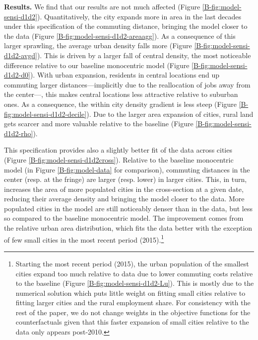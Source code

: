\documentclass[11pt]{report}
\begin{document}
\textbf{Results.} We find that our results are not much affected (Figure \ref{B-fig:model-sensi-d1d2}). Quantitatively, the city expands more in area in the last decades under this specification of the commuting distance, bringing the model closer to the data (Figure \ref{B-fig:model-sensi-d1d2-areaagg}). As a consequence of this larger sprawling, the average urban density falls more (Figure \ref{B-fig:model-sensi-d1d2-avgd}). This is driven by a larger fall of central density, the most noticeable difference relative to our baseline monocentric model (Figure \ref{B-fig:model-sensi-d1d2-d0}). With urban expansion, residents in central locations end up commuting larger distances---implicitly due to the reallocation of jobs away from the center---, this makes central locations less attractive relative to suburban ones. As a consequence, the within city density gradient is less steep (Figure \ref{B-fig:model-sensi-d1d2-decile}). Due to the larger area expansion of cities, rural land gets scarcer and more valuable relative to the baseline (Figure \ref{B-fig:model-sensi-d1d2-rho}).


This specification provides also a slightly better fit of the data across cities (Figure \ref{B-fig:model-sensi-d1d2cross}). Relative to the baseline monocentric model (in Figure \ref{B-fig:model-data} for comparison), commuting distances in the center (resp. at the fringe) are larger (resp. lower) in larger cities. This, in turn, increases the area of more populated cities in the cross-section at a given date, reducing their average density and bringing the model closer to the data. More populated cities in the model are still noticeably denser than in the data, but less so compared to the baseline monocentric model. The improvement comes from the relative urban area distribution, which fits the data better with the exception of few small cities in the most recent period (2015).\footnote{Starting the most recent period (2015), the urban population of the smallest cities expand too much relative to data due to lower commuting costs relative to the baseline (Figure \ref{B-fig:model-sensi-d1d2-Lu}). This is mostly due to the numerical solution which puts little weight on fitting small cities relative to fitting larger cities and the rural employment share. For consistency with the rest of the paper, we do not change weights in the objective functions for the counterfactuals given that this faster expansion of small cities relative to the data only appears post-2010.}
\end{document}
